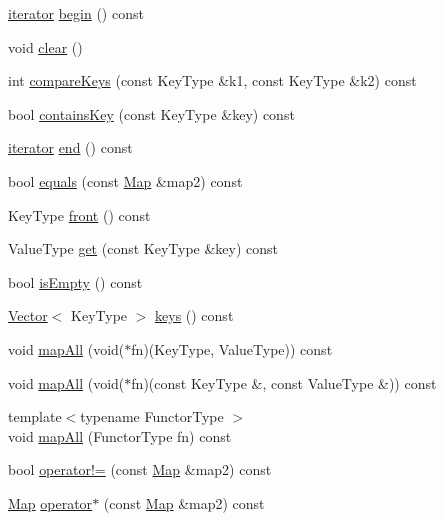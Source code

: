 \begin{DoxyCompactItemize}
\item 
\mbox{\hyperlink{classMap_1_1iterator}{iterator}} \mbox{\hyperlink{classMap_a0c62c15c8ed609e7e5e9518cf5f5c712}{begin}} () const
\item 
void \mbox{\hyperlink{classMap_ac8bb3912a3ce86b15842e79d0b421204}{clear}} ()
\item 
int \mbox{\hyperlink{classMap_a3c48bf82825a2262058961e44e376151}{compare\+Keys}} (const Key\+Type \&k1, const Key\+Type \&k2) const
\item 
bool \mbox{\hyperlink{classMap_a37473445b6725c5f0fc59a32ea2e645e}{contains\+Key}} (const Key\+Type \&key) const
\item 
\mbox{\hyperlink{classMap_1_1iterator}{iterator}} \mbox{\hyperlink{classMap_a68b688a51bd0cf6fb5bc2cba292209a8}{end}} () const
\item 
bool \mbox{\hyperlink{classMap_a91a1c833c72a288f2e2ea0207449513a}{equals}} (const \mbox{\hyperlink{classMap}{Map}} \&map2) const
\item 
Key\+Type \mbox{\hyperlink{classMap_a6e76878901fa73e176909ac015834f1a}{front}} () const
\item 
Value\+Type \mbox{\hyperlink{classMap_a3ac97b0a9a7fa131221427f628667ae9}{get}} (const Key\+Type \&key) const
\item 
bool \mbox{\hyperlink{classMap_acf82f9b2937375c7b1cf3dccb3df3312}{is\+Empty}} () const
\item 
\mbox{\hyperlink{classVector}{Vector}}$<$ Key\+Type $>$ \mbox{\hyperlink{classMap_a88e3a058d30d97a5ce6ae57608e7db17}{keys}} () const
\item 
void \mbox{\hyperlink{classMap_a19f96e0d9ac469495dd46924139d697e}{map\+All}} (void($\ast$fn)(Key\+Type, Value\+Type)) const
\item 
void \mbox{\hyperlink{classMap_a02c631ce6ad1bdf96e585f7041ab5556}{map\+All}} (void($\ast$fn)(const Key\+Type \&, const Value\+Type \&)) const
\item 
{\footnotesize template$<$typename Functor\+Type $>$ }\\void \mbox{\hyperlink{classMap_a8dc32c1e45704cfae41daf8adb4e66dc}{map\+All}} (Functor\+Type fn) const
\item 
bool \mbox{\hyperlink{classMap_a0a372de2f537b6d74ad13d6bd26f0414}{operator!=}} (const \mbox{\hyperlink{classMap}{Map}} \&map2) const
\item 
\mbox{\hyperlink{classMap}{Map}} \mbox{\hyperlink{classMap_a078716a91244790312e19db9daf692db}{operator$\ast$}} (const \mbox{\hyperlink{classMap}{Map}} \&map2) const
\item 

\end{DoxyCompactItemize}
